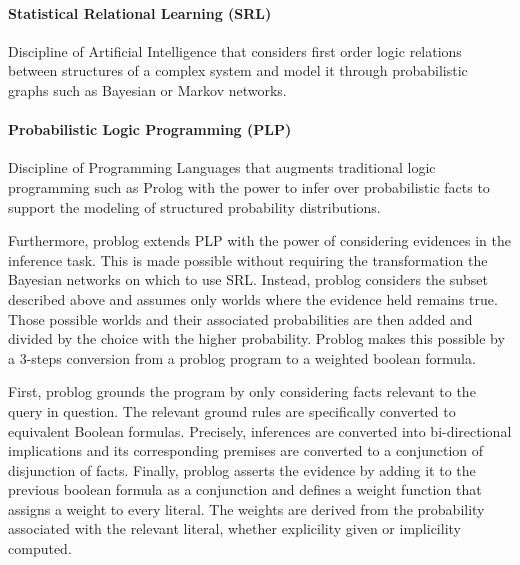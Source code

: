 \paragraph{Statistical Relational Learning (SRL)}
    Discipline of Artificial Intelligence that considers first order logic relations between 
    structures of a complex system and model it through probabilistic graphs such as Bayesian or 
    Markov networks.

\paragraph{Probabilistic Logic Programming (PLP)}
    Discipline of Programming Languages that augments traditional logic programming such as Prolog 
    with the power to infer over probabilistic facts to support the modeling of structured 
    probability distributions.


Furthermore, problog extends PLP with the power of considering evidences 
in the inference task. This is made possible without requiring the transformation 
the Bayesian networks on which to use SRL. Instead, problog considers the subset described above 
and assumes only worlds where the evidence held remains true. Those possible worlds and their associated 
probabilities are then added and divided by the choice with the higher probability. Problog makes this 
possible by a 3-steps conversion from a problog program to a weighted boolean formula.

First, problog grounds the program by only considering facts relevant to the query in question. 
The relevant ground rules are specifically converted to equivalent Boolean formulas. 
Precisely, inferences are converted into bi-directional implications and its corresponding premises 
are converted to a conjunction of disjunction of facts. 
Finally, problog asserts the evidence by adding it to the previous boolean formula 
as a conjunction and defines a weight function that assigns a weight to every literal. 
The weights are derived from the probability associated with the relevant literal, whether explicility 
given or implicility computed. 

